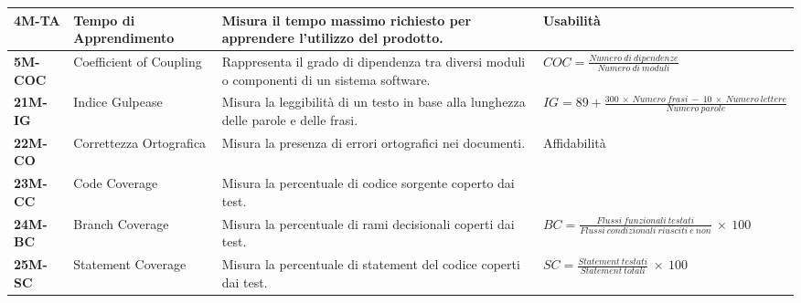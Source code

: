 \begin{longtable}{|>{\centering\arraybackslash}p{}|>{\centering\arraybackslash}p{}|>{\centering\arraybackslash}p{}|>{\centering\arraybackslash}p{}|}
	\hline
	\textbf{4M-TA}   & Tempo di Apprendimento               & Misura il tempo massimo richiesto per apprendere l'utilizzo del prodotto.                                                                                                                               & Usabilità                                                                                            \\
	\hline
	\textbf{5M-COC}  & Coefficient of Coupling              & Rappresenta il grado di dipendenza tra diversi moduli o componenti di un sistema software.                                                                                                              & $COC = \frac{Numero\: di\: dipendenze}{Numero\: di\: moduli}$                                        \\
	\hline
	\textbf{21M-IG}  & Indice Gulpease                      & Misura la leggibilità di un testo in base alla lunghezza delle parole e delle frasi.                                                                                                                    & $IG = 89 + \frac{300 \:\times \:Numero\:frasi \:- \:10 \:\times\: Numero\:lettere}{Numero\:parole}$  \\
	\hline
	\textbf{22M-CO}  & Correttezza Ortografica              & Misura la presenza di errori ortografici nei documenti.                                                                                                                                                 & Affidabilità                                                                                         \\
	\hline
	\textbf{23M-CC}  & Code Coverage                        & Misura la percentuale di codice sorgente coperto dai test.                                                                                                                                              &                                                                                                      \\
	\hline
	\textbf{24M-BC}  & Branch Coverage                      & Misura la percentuale di rami decisionali coperti dai test.                                                                                                                                             & $BC =\frac{Flussi\:funzionali\: testati}{Flussi\:condizionali\: riusciti\: e\: non}\: \times \: 100$ \\
	\hline
	\textbf{25M-SC}  & Statement Coverage                   & Misura la percentuale di statement del codice coperti dai test.                                                                                                                                         & $SC = \frac{Statement\: testati}{Statement\: totali}\: \times \: 100$                                \\

\end{longtable}
